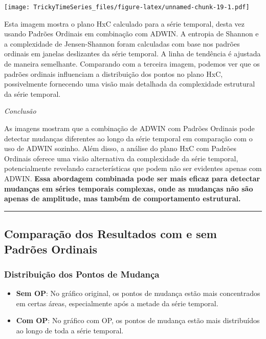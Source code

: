 \documentclass[
]{article}
\begin{document}
\texttt{[image: TrickyTimeSeries\_files/figure-latex/unnamed-chunk-19-1.pdf]}

Esta imagem mostra o plano HxC calculado para a série temporal, desta
vez usando Padrões Ordinais em combinação com ADWIN. A entropia de
Shannon e a complexidade de Jensen-Shannon foram calculadas com base nos
padrões ordinais em janelas deslizantes da série temporal. A linha de
tendência é ajustada de maneira semelhante. Comparando com a terceira
imagem, podemos ver que os padrões ordinais influenciam a distribuição
dos pontos no plano HxC, possivelmente fornecendo uma visão mais
detalhada da complexidade estrutural da série temporal.

\emph{Conclusão}

As imagens mostram que a combinação de ADWIN com Padrões Ordinais pode
detectar mudanças diferentes ao longo da série temporal em comparação
com o uso de ADWIN sozinho. Além disso, a análise do plano HxC com
Padrões Ordinais oferece uma visão alternativa da complexidade da série
temporal, potencialmente revelando características que podem não ser
evidentes apenas com ADWIN. \textbf{Essa abordagem combinada pode ser
mais eficaz para detectar mudanças em séries temporais complexas, onde
as mudanças não são apenas de amplitude, mas também de comportamento
estrutural.}

\begin{center}\rule{0.5\linewidth}{0.5pt}\end{center}

\hypertarget{comparauxe7uxe3o-dos-resultados-com-e-sem-padruxf5es-ordinais}{%
\subsection{Comparação dos Resultados com e sem Padrões
Ordinais}\label{comparauxe7uxe3o-dos-resultados-com-e-sem-padruxf5es-ordinais}}

\hypertarget{distribuiuxe7uxe3o-dos-pontos-de-mudanuxe7a}{%
\subsubsection{Distribuição dos Pontos de
Mudança}\label{distribuiuxe7uxe3o-dos-pontos-de-mudanuxe7a}}

\begin{itemize}
\item
  \textbf{Sem OP}: No gráfico original, os pontos de mudança estão mais
  concentrados em certas áreas, especialmente após a metade da série
  temporal.
\item
  \textbf{Com OP}: No gráfico com OP, os pontos de mudança estão mais
  distribuídos ao longo de toda a série temporal.
\end{itemize}
\end{document}

